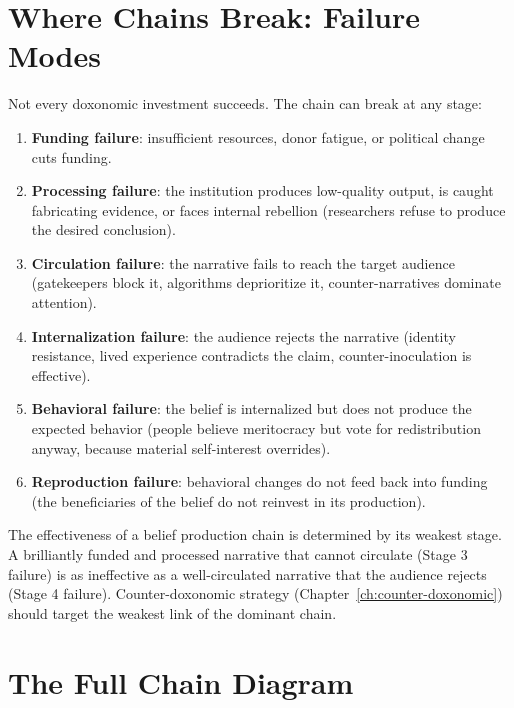 \section{Where Chains Break: Failure Modes}
\label{sec:ch5-failure}

Not every doxonomic investment succeeds.
The chain can break at any stage:

\begin{enumerate}[nosep]
  \item \textbf{Funding failure}: insufficient resources, donor fatigue, or political change cuts funding.
  \item \textbf{Processing failure}: the institution produces low-quality output, is caught fabricating evidence, or faces internal rebellion (researchers refuse to produce the desired conclusion).
  \item \textbf{Circulation failure}: the narrative fails to reach the target audience (gatekeepers block it, algorithms deprioritize it, counter-narratives dominate attention).
  \item \textbf{Internalization failure}: the audience rejects the narrative (identity resistance, lived experience contradicts the claim, counter-inoculation is effective).
  \item \textbf{Behavioral failure}: the belief is internalized but does not produce the expected behavior (people believe meritocracy but vote for redistribution anyway, because material self-interest overrides).
  \item \textbf{Reproduction failure}: behavioral changes do not feed back into funding (the beneficiaries of the belief do not reinvest in its production).
\end{enumerate}

\begin{principle}
\label{prin:weakest-link}
The effectiveness of a belief production chain is determined by its weakest stage.
A brilliantly funded and processed narrative that cannot circulate (Stage 3 failure) is as ineffective as a well-circulated narrative that the audience rejects (Stage 4 failure).
Counter-doxonomic strategy (Chapter~\ref{ch:counter-doxonomic}) should target the weakest link of the dominant chain.
\end{principle}


\section{The Full Chain Diagram}

